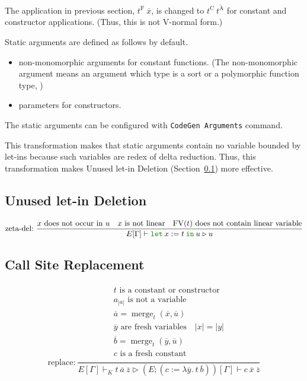 \documentclass[a4paper,fleqn]{article}
\newcommand{\kwlet}{\mbox{\color{mygreen}\ttfamily let}}
\newcommand{\kwin}{\mbox{\color{mygreen}\ttfamily in}}
\newcommand{\lam}[2]{\lambda #1.\:#2}
\newcommand{\glodefB}[2]{(#1:=#2)}
\newcommand{\letin}[3]{\kwlet\:#1:=#2\:\kwin\:#3}
\DeclareMathOperator{\FV}{FV}
\newcommand{\tF}{{t^\mathrm{F}}}
\newcommand{\tC}{{t^\mathrm{C}}}
\newcommand{\tA}{{t^\mathrm{A}}}
\DeclareMathOperator{\merg}{merge}
\newcommand{\secref}[1]{Section~\ref{#1}}
\newcommand{\reltri}{\mathrel{\triangleright}}
\newcommand{\rep}[1]{\overline{#1}}
\begin{document}
The application in previous section, $\tF\:\rep{x}$, is changed to $\tC\:\rep{\tA}$ for constant and constructor applications.
(Thus, this is not V-normal form.)

Static arguments are defined as follows by default.
\begin{itemize}
  \item non-monomorphic arguments for constant functions.
    (The non-monomorphic argument means an argument which type is a sort or a polymorphic function type,  )
  \item parameters for constructors.
\end{itemize}
The static arguments can be configured with \lstinline!CodeGen Arguments! command.

This transformation makes that static arguments contain no variable bounded by let-ins
because such variables are redex of delta reduction.
Thus, this transformation makes Unused let-in Deletion (\secref{sec:let-in-deletion}) more effective.

\subsection{Unused let-in Deletion}\label{sec:let-in-deletion}

\begin{gather*}
  \text{zeta-del:}~
    \dfrac{
      \text{$x$ does not occur in $u$} \quad \text{$x$ is not linear} \quad \text{$\FV(t)$ does not contain linear variable}
    }{E[\Gamma] \vdash \letin{x}{t}{u}
                       \reltri
                       u
    }
\end{gather*}

\subsection{Call Site Replacement}\label{sec:call-site-replacement}

\begin{gather*}
  \text{replace:}~
    \dfrac{
      \begin{gathered}
        \text{$t$ is a constant or constructor} \\
        \text{$a_{|a|}$ is not a variable} \\
        \rep{a} = \merg_t(\rep{x}, \rep{u}) \\
        \text{$\rep{y}$ are fresh variables} \quad
        |x| = |y| \\
        \rep{b} = \merg_t(\rep{y}, \rep{u}) \\
        \text{$c$ is a fresh constant} \\
      \end{gathered}
    }{E[\Gamma] \vdash_K t\:\rep{a}\:\rep{z}
      \reltri
      (E;\glodefB{c}{\lam{\rep{y}}{t\:\rep{b}}})[\Gamma] \vdash c\:\rep{x}\:\rep{z}
    }
\end{gather*}
\end{document}
